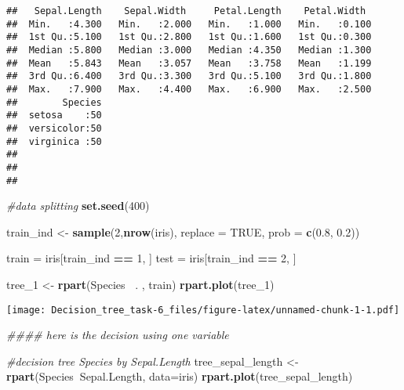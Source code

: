 \documentclass[
]{article}
\newenvironment{Shaded}{\begin{snugshade}}{\end{snugshade}}
\newcommand{\CommentTok}[1]{\textcolor[rgb]{0.56,0.35,0.01}{\textit{#1}}}
\newcommand{\DataTypeTok}[1]{\textcolor[rgb]{0.13,0.29,0.53}{#1}}
\newcommand{\DecValTok}[1]{\textcolor[rgb]{0.00,0.00,0.81}{#1}}
\newcommand{\FloatTok}[1]{\textcolor[rgb]{0.00,0.00,0.81}{#1}}
\newcommand{\KeywordTok}[1]{\textcolor[rgb]{0.13,0.29,0.53}{\textbf{#1}}}
\newcommand{\NormalTok}[1]{#1}
\newcommand{\OperatorTok}[1]{\textcolor[rgb]{0.81,0.36,0.00}{\textbf{#1}}}
\newcommand{\OtherTok}[1]{\textcolor[rgb]{0.56,0.35,0.01}{#1}}
\newcommand{\StringTok}[1]{\textcolor[rgb]{0.31,0.60,0.02}{#1}}
\begin{document}
\begin{verbatim}
##   Sepal.Length    Sepal.Width     Petal.Length    Petal.Width   
##  Min.   :4.300   Min.   :2.000   Min.   :1.000   Min.   :0.100  
##  1st Qu.:5.100   1st Qu.:2.800   1st Qu.:1.600   1st Qu.:0.300  
##  Median :5.800   Median :3.000   Median :4.350   Median :1.300  
##  Mean   :5.843   Mean   :3.057   Mean   :3.758   Mean   :1.199  
##  3rd Qu.:6.400   3rd Qu.:3.300   3rd Qu.:5.100   3rd Qu.:1.800  
##  Max.   :7.900   Max.   :4.400   Max.   :6.900   Max.   :2.500  
##        Species  
##  setosa    :50  
##  versicolor:50  
##  virginica :50  
##                 
##                 
## 
\end{verbatim}

\begin{Shaded}
\begin{Highlighting}[]
\CommentTok{#data splitting}
\KeywordTok{set.seed}\NormalTok{(}\DecValTok{400}\NormalTok{)}

\NormalTok{train_ind <-}\StringTok{ }\KeywordTok{sample}\NormalTok{(}\DecValTok{2}\NormalTok{,}\KeywordTok{nrow}\NormalTok{(iris), }\DataTypeTok{replace =} \OtherTok{TRUE}\NormalTok{, }\DataTypeTok{prob =} \KeywordTok{c}\NormalTok{(}\FloatTok{0.8}\NormalTok{, }\FloatTok{0.2}\NormalTok{))}

\NormalTok{train =}\StringTok{ }\NormalTok{iris[train_ind }\OperatorTok{==}\StringTok{ }\DecValTok{1}\NormalTok{, ]}
\NormalTok{test =}\StringTok{ }\NormalTok{iris[train_ind }\OperatorTok{==}\StringTok{ }\DecValTok{2}\NormalTok{, ]}

\NormalTok{tree_}\DecValTok{1}\NormalTok{ <-}\StringTok{ }\KeywordTok{rpart}\NormalTok{(Species }\OperatorTok{~}\NormalTok{. , train)}
\KeywordTok{rpart.plot}\NormalTok{(tree_}\DecValTok{1}\NormalTok{)}
\end{Highlighting}
\end{Shaded}

\texttt{[image: Decision\_tree\_task-6\_files/figure-latex/unnamed-chunk-1-1.pdf]}

\begin{Shaded}
\begin{Highlighting}[]
\CommentTok{#### here is the decision using one variable}

\CommentTok{#decision tree Species by Sepal.Length}
\NormalTok{tree_sepal_length <-}\StringTok{ }\KeywordTok{rpart}\NormalTok{(Species}\OperatorTok{~}\NormalTok{Sepal.Length, }\DataTypeTok{data=}\NormalTok{iris)}
\KeywordTok{rpart.plot}\NormalTok{(tree_sepal_length)}
\end{Highlighting}
\end{Shaded}
\end{document}
